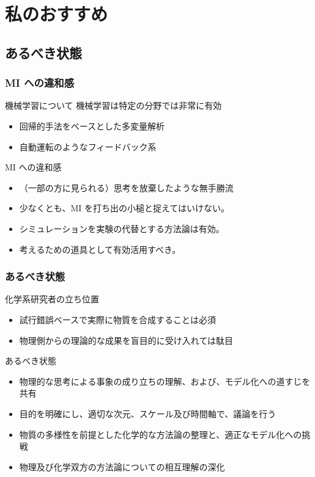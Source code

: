\documentclass[12pt, dvipdfmx]{beamer}
\begin{document}
\section{私のおすすめ}
\subsection{あるべき状態}
\begin{frame}
    \frametitle{MI への違和感}
    \begin{block}{機械学習について}
        機械学習は特定の分野では非常に有効
        \begin{itemize}
            \item 回帰的手法をベースとした多変量解析
            \item 自動運転のようなフィードバック系
        \end{itemize}
    \end{block}
    \begin{exampleblock}{MI への違和感}
        \begin{itemize}
            \item （一部の方に見られる）思考を放棄したような無手勝流
            \item 少なくとも、MI を打ち出の小槌と捉えてはいけない。
            \item シミュレーションを実験の代替とする方法論は有効。
            \item 考えるための道具として有効活用すべき。
        \end{itemize}
    \end{exampleblock}
\end{frame}

\begin{frame}
    \frametitle{あるべき状態}
    \begin{exampleblock}{化学系研究者の立ち位置}
        \begin{itemize}
            \item 試行錯誤ベースで実際に物質を合成することは必須
            \item 物理側からの理論的な成果を盲目的に受け入れては駄目
        \end{itemize}
    \end{exampleblock}
    \begin{alertblock}{あるべき状態}
        \begin{itemize}
            \item 物理的な思考による事象の成り立ちの理解、および、モデル化への道すじを共有
            \item 目的を明確にし、適切な次元、スケール及び時間軸で、議論を行う
            \item 物質の多様性を前提とした化学的な方法論の整理と、適正なモデル化への挑戦
            \item 物理及び化学双方の方法論についての相互理解の深化
        \end{itemize}
    \end{alertblock}
\end{frame}
\end{document}
